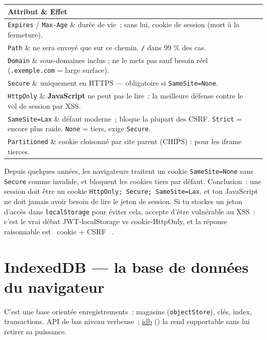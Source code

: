 \documentclass[12pt,a4paper,twoside,openright]{book}
\makeatletter
\providecommand{\cmd}[1]{}%
\renewcommand{\cmd}[1]{\srcbox{\texttt{\detokenize{#1}}}}
\newcommand{\link}[2]{\href{#2}{#1}}
\newenvironment{tabz}[1]{\rowcolors{2}{white}{tralight}%
  \small\setlength{\tabcolsep}{5pt}\setlength{\LTpre}{3pt}\setlength{\LTpost}{3pt}%
  \begin{longtable}{@{}#1@{}}\toprule}
  {\bottomrule\end{longtable}\normalfont\setlength{\tabcolsep}{6pt}}
\newcommand{\thd}[1]{\textbf{\color{white}#1}}
\newcommand{\headrow}{\rowcolor{theadbg}}
\makeatother
\begin{document}
\begin{tabz}{lX}
  \headrow \thd{Attribut} \& \thd{Effet} \\
  \midrule
  \verb|Expires| / \verb|Max-Age| \& dur\'ee de vie~; sans lui, cookie de session (mort \`a la fermeture). \\
  \verb|Path| \& ne sera envoy\'e que sur ce chemin. \verb|/| dans 99 \% des cas. \\
  \verb|Domain| \& sous-domaines inclus ; ne le mets pas sauf besoin r\'eel (\verb|.exemple.com| = large surface). \\
  \verb|Secure| \& uniquement en HTTPS --- obligatoire si \verb|SameSite=None|. \\
  \verb|HttpOnly| \& \textbf{JavaScript} ne peut pas le lire~: la meilleure d\'efense contre le vol de session par XSS. \\
  \verb|SameSite=Lax|  \& d\'efaut moderne~; bloque la plupart des CSRF. \verb|Strict| = encore plus raide. \verb|None| = tiers, exige \verb|Secure|. \\
  \verb|Partitioned| \& cookie cloisonn\'e par site parent (CHIPS) : pour les iframe tierces. \\
\end{tabz}

\begin{note}
Depuis quelques ann\'ees, les navigateurs traitent un cookie \verb|SameSite=None| sans
\verb|Secure| comme invalide, et bloquent les cookies tiers par d\'efaut. Conclusion~: une
session doit \^etre un cookie \verb|HttpOnly; Secure; SameSite=Lax|, et ton JavaScript ne doit
jamais avoir besoin de lire le jeton de session. Si tu stockes un jeton d'acc\`es dans
\verb|localStorage| pour \'eviter cela, accepte d'\^etre vuln\'erable au XSS~: c'est le vrai d\'ebat
JWT-localStorage vs cookie-HttpOnly, et la r\'eponse raisonnable est \og ~cookie + CSRF~ \fg{}.
\end{note}

\section{IndexedDB --- la base de donn\'ees du navigateur}

C'est une base orient\'ee enregistrements~: magasins (\texttt{objectStore}), cl\'es, index,
transactions. API de bas niveau verbeuse~; \link{idb}{https://github.com/jakearchibald/idb}
(\cmd{npm i idb}) la rend supportable sans lui retirer sa puissance.
\end{document}
